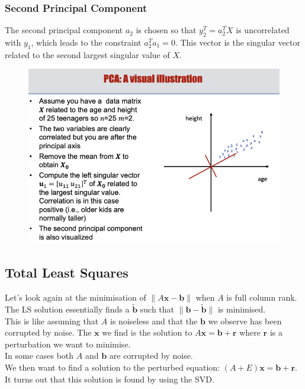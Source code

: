 \subsubsection*{Second Principal Component}

The second principal component \( a_2 \) is chosen so that \( y_2^T = a_2^T X \) is uncorrelated with \( y_1 \), which leads to the constraint \( a_2^T a_1 = 0 \). This vector is the singular vector related to the second largest singular value of \( X \).


\begin{figure}[H]
    \centering
    \includegraphics[width=0.75\linewidth]{img/pca-eg.png}
    
    
\end{figure}
\subsection{Total Least Squares}

Let's look again at the minimisation of \(\|A\mathbf{x} - \mathbf{b}\|\) when \( A \) is full column rank. The LS solution essentially finds a \(\mathbf{\tilde{b}}\) such that \(\|\mathbf{b} - \mathbf{\tilde{b}}\|\) is minimised.\\

This is like assuming that \( A \) is noiseless and that the \( \mathbf{b} \) we observe has been corrupted by noise. The \( \mathbf{x} \) we find is the solution to \( A\mathbf{x} = \mathbf{b} + \mathbf{r} \) where \( \mathbf{r} \) is a perturbation we want to minimise.\\

In some cases both \( A \) and \( \mathbf{b} \) are corrupted by noise.\\

We then want to find a solution to the perturbed equation: \( (A + E)\mathbf{x} = \mathbf{b} + \mathbf{r} \). It turns out that this solution is found by using the SVD.\\

